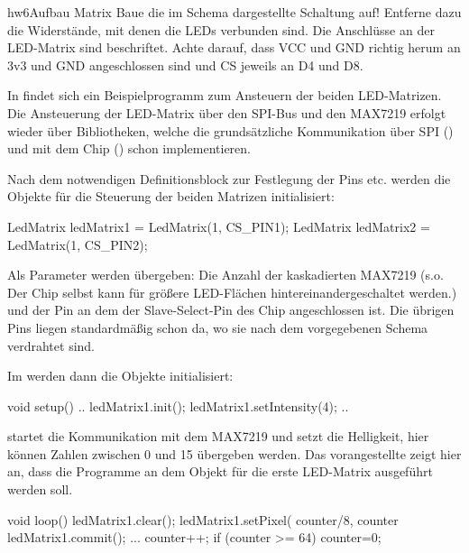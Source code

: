 \begin{multicols}{2}
\vfill\null\pagebreak
\begin{excercise}{hw6}{Aufbau Matrix}
Baue die im Schema  dargestellte Schaltung auf! Entferne dazu die Widerstände, mit denen die LEDs verbunden sind.
Die Anschlüsse an der LED-Matrix sind beschriftet. Achte darauf, dass VCC und GND richtig herum an 3v3 und GND angeschlossen 
sind und CS jeweils an D4 und D8.
\end{excercise}

\vfill\null\columnbreak
{}
In  findet sich ein Beispielprogramm zum Ansteuern der beiden LED-Matrizen.
Die Ansteuerung der LED-Matrix über den SPI-Bus und den MAX7219 erfolgt wieder über Bibliotheken,
welche die grundsätzliche Kommunikation über SPI () und mit dem Chip () 
schon implementieren.

Nach dem notwendigen Definitionsblock zur Festlegung der Pins etc. werden die Objekte für die Steuerung der 
beiden Matrizen initialisiert:
\begin{src}
LedMatrix ledMatrix1 = 
  LedMatrix(1, CS_PIN1);
LedMatrix ledMatrix2 = 
  LedMatrix(1, CS_PIN2);
\end{src}

Als Parameter werden übergeben: Die Anzahl der kaskadierten MAX7219 (s.o. Der Chip selbst kann für größere LED-Flächen
hintereinandergeschaltet werden.) und der Pin an dem der Slave-Select-Pin des Chip angeschlossen ist. Die übrigen
Pins liegen standardmäßig schon da, wo sie nach dem vorgegebenen Schema verdrahtet sind.

Im  werden dann die Objekte initialisiert:

\begin{src}
void setup() {
  ..
  ledMatrix1.init();
  ledMatrix1.setIntensity(4);
  ..
}
\end{src}

 startet die Kommunikation mit dem MAX7219 und  setzt die Helligkeit, 
hier können Zahlen zwischen 0 und 15 übergeben werden. Das vorangestellte  zeigt 
hier an, dass die Programme an dem Objekt für die erste LED-Matrix ausgeführt werden soll.

\begin{src}
void loop() 
{
    ledMatrix1.clear();
    ledMatrix1.setPixel(
      counter/8, counter%
    ledMatrix1.commit();
    ...
    counter++;
    if (counter >= 64) 
      counter=0; 
}
\end{src}


\end{multicols}

